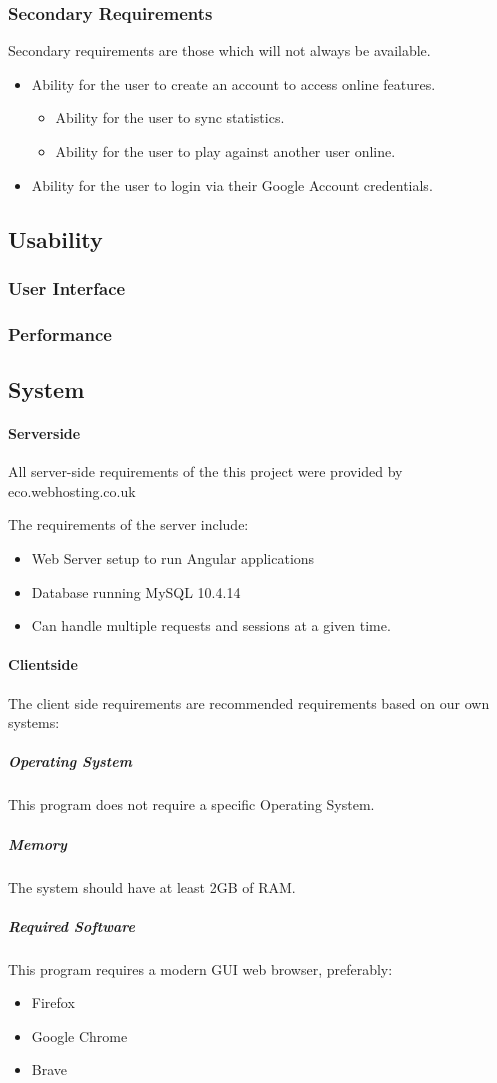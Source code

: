	\subsubsection{Secondary Requirements}
	Secondary requirements are those which will not always be available.
	\begin{itemize}
		\item Ability for the user to create an account to access online features.
		\begin{itemize}
			\item Ability for the user to sync statistics.
			\item Ability for the user to play against another user online.
		\end{itemize}
	\item Ability for the user to login via their Google Account credentials.
	\end{itemize}
	\subsection{Usability}
	\subsubsection{User Interface}
	
	\subsubsection{Performance}
	
	\subsection{System}
	\paragraph{Serverside}
	All server-side requirements of the this project were provided by eco.webhosting.co.uk
	
	The requirements of the server include:
	\begin{itemize}
		\item Web Server setup to run Angular applications
		\item Database running MySQL 10.4.14
		\item Can handle multiple requests and sessions at a given time.
	\end{itemize}

	\paragraph{Clientside}
	The client side requirements are recommended requirements based on our own systems:
	\subparagraph{Operating System}
	This program does not require a specific Operating System.
	\subparagraph{Memory}
	The system should have at least 2GB of RAM.
	\subparagraph{Required Software}
	This program requires a modern GUI web browser, preferably:
	\begin{itemize}
		\item Firefox 
		\item Google Chrome
		\item Brave
	\end{itemize}
